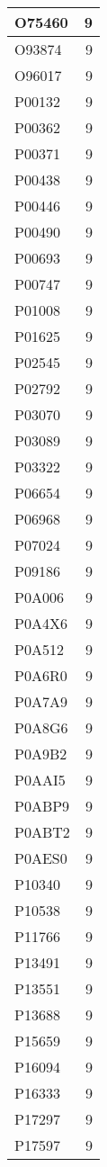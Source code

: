 \documentclass[
]{book}
\theoremstyle{definition}
\theoremstyle{definition}
\theoremstyle{definition}
\theoremstyle{definition}
\theoremstyle{remark}
\begin{document}
\begin{table}
\begin{tabular}{l|r}
\hline
O75460 & 9\\
\hline
O93874 & 9\\
\hline
O96017 & 9\\
\hline
P00132 & 9\\
\hline
P00362 & 9\\
\hline
P00371 & 9\\
\hline
P00438 & 9\\
\hline
P00446 & 9\\
\hline
P00490 & 9\\
\hline
P00693 & 9\\
\hline
P00747 & 9\\
\hline
P01008 & 9\\
\hline
P01625 & 9\\
\hline
P02545 & 9\\
\hline
P02792 & 9\\
\hline
P03070 & 9\\
\hline
P03089 & 9\\
\hline
P03322 & 9\\
\hline
P06654 & 9\\
\hline
P06968 & 9\\
\hline
P07024 & 9\\
\hline
P09186 & 9\\
\hline
P0A006 & 9\\
\hline
P0A4X6 & 9\\
\hline
P0A512 & 9\\
\hline
P0A6R0 & 9\\
\hline
P0A7A9 & 9\\
\hline
P0A8G6 & 9\\
\hline
P0A9B2 & 9\\
\hline
P0AAI5 & 9\\
\hline
P0ABP9 & 9\\
\hline
P0ABT2 & 9\\
\hline
P0AES0 & 9\\
\hline
P10340 & 9\\
\hline
P10538 & 9\\
\hline
P11766 & 9\\
\hline
P13491 & 9\\
\hline
P13551 & 9\\
\hline
P13688 & 9\\
\hline
P15659 & 9\\
\hline
P16094 & 9\\
\hline
P16333 & 9\\
\hline
P17297 & 9\\
\hline
P17597 & 9\\

\end{tabular}
\end{table}
\end{document}
